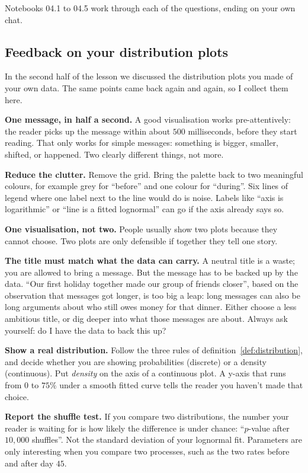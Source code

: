 \documentclass[12pt, a4paper]{article}
\theoremstyle{definition}
\theoremstyle{remark}
\begin{document}
Notebooks 04.1 to 04.5 work through each of the questions, ending on your own chat.

\subsection{Feedback on your distribution plots}
\label{sec:showing}
In the second half of the lesson we discussed the distribution plots you made of your own data. The same points came back again and again, so I collect them here.

\textbf{One message, in half a second.} A good visualisation works pre-attentively: the reader picks up the message within about $500$ milliseconds, before they start reading. That only works for simple messages: something is bigger, smaller, shifted, or happened. Two clearly different things, not more.

\textbf{Reduce the clutter.} Remove the grid. Bring the palette back to two meaningful colours, for example grey for ``before'' and one colour for ``during''. Six lines of legend where one label next to the line would do is noise. Labels like ``axis is logarithmic'' or ``line is a fitted lognormal'' can go if the axis already says so.

\textbf{One visualisation, not two.} People usually show two plots because they cannot choose. Two plots are only defensible if together they tell one story.

\textbf{The title must match what the data can carry.} A neutral title is a waste; you are allowed to bring a message. But the message has to be backed up by the data. ``Our first holiday together made our group of friends closer'', based on the observation that messages got longer, is too big a leap: long messages can also be long arguments about who still owes money for that dinner. Either choose a less ambitious title, or dig deeper into what those messages are about. Always ask yourself: do I have the data to back this up?

\textbf{Show a real distribution.} Follow the three rules of definition~\ref{def:distribution}, and decide whether you are showing probabilities (discrete) or a density (continuous). Put \emph{density} on the axis of a continuous plot. A y-axis that runs from $0$ to $75\%$ under a smooth fitted curve tells the reader you haven't made that choice.

\textbf{Report the shuffle test.} If you compare two distributions, the number your reader is waiting for is how likely the difference is under chance: ``$p$-value after $10{,}000$ shuffles''. Not the standard deviation of your lognormal fit. Parameters are only interesting when you compare two processes, such as the two rates before and after day $45$.
\end{document}
